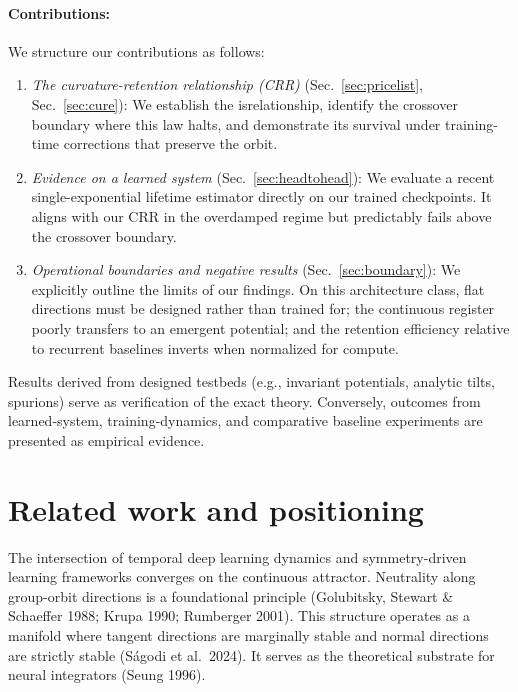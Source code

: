 \documentclass{article}
\begin{document}
\paragraph{Contributions:} We structure our contributions as follows:
\begin{enumerate}
\item \emph{The curvature-retention relationship (CRR)} (Sec.~\ref{sec:pricelist}, Sec.~\ref{sec:cure}): We establish the
isrelationship, identify the crossover boundary where this law halts, and demonstrate its survival under training-time corrections that preserve the orbit.
\item \emph{Evidence on a learned system} (Sec.~\ref{sec:headtohead}): We evaluate a recent single-exponential lifetime estimator directly on our trained checkpoints. It aligns with our CRR in the overdamped regime but predictably fails above the crossover boundary.
\item \emph{Operational boundaries and negative results} (Sec.~\ref{sec:boundary}): We explicitly outline the limits of our findings. On this architecture class, flat directions must be designed rather than trained for; the continuous register poorly transfers to an emergent potential; and the retention efficiency relative to recurrent baselines inverts when normalized for compute.
\end{enumerate}
Results derived from designed testbeds (e.g., invariant potentials, analytic tilts, spurions) serve as verification of the exact theory. Conversely, outcomes from learned-system, training-dynamics, and comparative baseline experiments are presented as empirical evidence.

\section{Related work and positioning}\label{sec:related}

The intersection of temporal deep learning dynamics and symmetry-driven learning frameworks converges on the continuous attractor. Neutrality along group-orbit directions is a foundational principle (Golubitsky, Stewart \& Schaeffer 1988; Krupa 1990; Rumberger 2001). This structure operates as a manifold where tangent directions are marginally stable and normal directions are strictly stable (S\'agodi et al.\ 2024). It serves as the theoretical substrate for neural integrators (Seung 1996).
\end{document}
